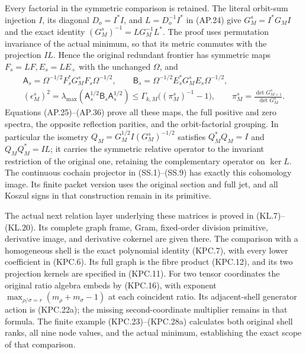 Every factorial in the symmetric comparison is retained.  The
literal orbit-sum injection \(I\), its diagonal
\(D_o=I^*I\), and \(L=D_o^{-1}I^*\) in (AP.24)
give \(G_M^s=I^*G_MI\) and the exact identity
\((G_M^s)^{-1}=LG_M^{-1}L^*\).  The proof uses
permutation invariance of the actual minimum, so that its metric
commutes with the projection \(IL\).  Hence the original
redundant frontier has symmetric maps \(F_s=LF,E_s=LE_+\)
with the unchanged \(\Omega\), and
\[
 \begin{gathered}
 \mathsf A_s=\Omega^{-1/2}F_s^*G_M^sF_s\Omega^{-1/2},
 \qquad
 \mathsf B_s=\Omega^{-1/2}E_s^*G_M^sE_s\Omega^{-1/2},\\
 (\epsilon_M^s)^2
  =\lambda_{\max}(\mathsf A_s^{1/2}\mathsf B_s\mathsf A_s^{1/2})
  \le\Gamma_{k,M}\bigl((\pi_M^s)^{-1}-1\bigr),
 \qquad \pi_M^s=\frac{\det G_{M+1}^s}{\det G_M^s}.
 \end{gathered}
 \tag{R14}
\]
Equations (AP.25)--(AP.36) prove all these maps, the full
positive and zero spectra, the opposite reflection parities,
and the orbit-factorial grouping.  In particular the isometry
\(Q_M=G_M^{1/2}I(G_M^s)^{-1/2}\) satisfies
\(Q_M^*Q_M=I\) and \(Q_MQ_M^*=IL\); it carries
the symmetric relative operator to the invariant restriction of
the original one, retaining the complementary operator on
\(\ker L\).  The continuous cochain projector in
(SS.1)--(SS.9) has exactly this cohomology image.  Its finite
packet version uses the original section and full jet, and all
Koszul signs in that construction remain in its primitive.

The actual next relation layer underlying these matrices is proved
in (KL.7)--(KL.20).  Its complete graph frame, Gram, fixed-order
division primitive, derivative image, and derivative cokernel are
given there.  The comparison with a homogeneous shell is the
exact polynomial identity (KPC.7), with every lower coefficient
in (KPC.6).  Its full graph is the fibre product (KPC.12),
and its two projection kernels are specified in (KPC.11).
For two tensor coordinates the original ratio algebra embeds by
(KPC.16), with exponent
\(\max_{\rho/\sigma=r}(m_\rho+m_\sigma-1)\) at each
coincident ratio.  Its adjacent-shell generator action is
(KPC.22a); the missing second-coordinate multiplier remains in
that formula.  The finite example (KPC.23)--(KPC.28a) calculates
both original shell ranks, all nine node values, and the actual
minimum, establishing the exact scope of that comparison.

